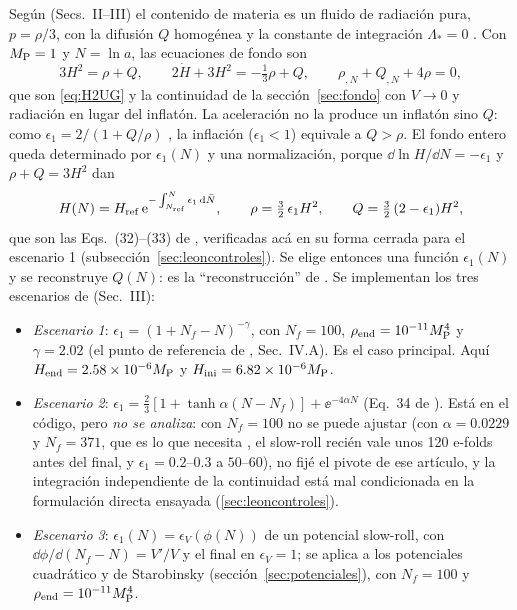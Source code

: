 Según \cite{leon22} (Secs.~II--III) el contenido de materia es un fluido de radiación pura, $p=\rho/3$, con la difusión $Q$ homogénea y la constante de integración $\Lambda_*=0$ . Con $M_{\rm P}=1$ y $N=\ln a$, las ecuaciones de fondo son
\begin{equation}
3H^2=\rho+Q,\qquad 2\dot H+3H^2=-\tfrac13\rho+Q,\qquad \rho_{,N}+Q_{,N}+4\rho=0,
\label{eq:leonfondo}
\end{equation}
que son \eqref{eq:H2UG} y la continuidad de la sección~\ref{sec:fondo} con $V\to0$ y radiación en lugar del inflatón. La aceleración no la produce un inflatón sino $Q$: como $\epsilon_1=2/(1+Q/\rho)$ \cite[Eq.~18]{leon22}, la inflación ($\epsilon_1<1$) equivale a $Q>\rho$. El fondo entero queda determinado por $\epsilon_1(N)$ y una normalización, porque $\dd\ln H/\dd N=-\epsilon_1$ y $\rho+Q=3H^2$ dan
\begin{equation}
H(N)=H_{\rm ref}\,\mathrm e^{-\int_{N_{\rm ref}}^{N}\epsilon_1\,\mathrm d\bar N},\qquad \rho=\tfrac32\,\epsilon_1H^2,\qquad Q=\tfrac32\,(2-\epsilon_1)H^2,
\label{eq:leonrec}
\end{equation}
que son las Eqs.~(32)--(33) de \cite{leon22} , verificadas acá en su forma cerrada para el escenario 1 (subsección~\ref{sec:leoncontroles}). Se elige entonces una función $\epsilon_1(N)$ y se reconstruye $Q(N)$: es la ``reconstrucción'' de \cite{leon22,piccirilli23}. Se implementan los tres escenarios de \cite{piccirilli23} (Sec.~III):
\begin{itemize}[leftmargin=1.6em,itemsep=2pt]
\item \emph{Escenario 1}: $\epsilon_1=(1+N_f-N)^{-\gamma}$, con $N_f=100$, $\rho_{\rm end}=10^{-11}M_{\rm P}^4$ y $\gamma=2.02$ (el punto de referencia de \cite{piccirilli23}, Sec.~IV.A). Es el caso principal. Aquí $H_{\rm end}=2.58\times10^{-6}M_{\rm P}$ y $H_{\rm ini}=6.82\times10^{-6}M_{\rm P}$.
\item \emph{Escenario 2}: $\epsilon_1=\tfrac23[1+\tanh\alpha(N-N_f)]+\ee^{-4\alpha N}$ (Eq.~34 de \cite{leon22}). Está en el código, pero \emph{no se analiza}: con $N_f=100$ no se puede ajustar (con $\alpha=0.0229$ y $N_f=371$, que es lo que necesita \cite{piccirilli23}, el slow-roll recién vale unos 120 e-folds antes del final, y $\epsilon_1=0.2$--$0.3$ a $50$--$60$), no fijé el pivote de ese artículo, y la integración independiente de la continuidad está mal condicionada en la formulación directa ensayada (\ref{sec:leoncontroles}).
\item \emph{Escenario 3}: $\epsilon_1(N)=\epsilon_V(\phi(N))$ de un potencial slow-roll, con $\dd\phi/\dd(N_f-N)=V'/V$ y el final en $\epsilon_V=1$; se aplica a los potenciales cuadrático y de Starobinsky (sección~\ref{sec:potenciales}), con $N_f=100$ y $\rho_{\rm end}=10^{-11}M_{\rm P}^4$.
\end{itemize}
